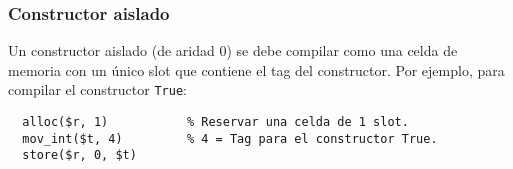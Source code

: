 \documentclass{article}
\newcommand{\fl}[1]{\texttt{#1}}
\newcommand{\astkw}[1]{\texttt{\textcolor{red}{"#1"}}}
\newcommand{\astid}[1]{\texttt{"#1"}}
\newcommand{\instruction}[1]{\texttt{\textcolor{blue}{#1}}}
\begin{document}
% 
% 

\subsubsection{Constructor aislado}

Un constructor aislado (de aridad 0)
se debe compilar como una celda de memoria
con un único slot que contiene el tag del constructor.
Por ejemplo, para compilar el constructor \texttt{True}:
\begin{verbatim}
  alloc($r, 1)           % Reservar una celda de 1 slot.
  mov_int($t, 4)         % 4 = Tag para el constructor True.
  store($r, 0, $t)
\end{verbatim}
\end{document}

